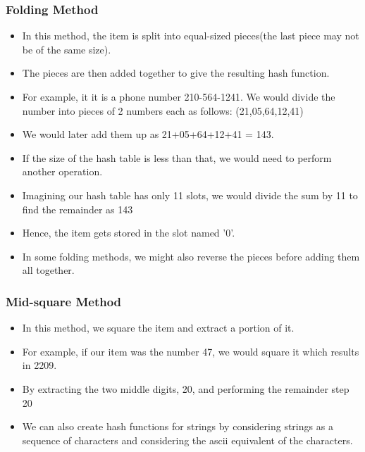 \documentclass{beamer}
\begin{document}
\begin{frame}
\frametitle{Folding Method}
\begin{itemize}
\item In this method, the item is split into equal-sized pieces(the last piece may not be of the same size).
\item The pieces are then added together to give the resulting hash function.
\item For example, it it is a phone number 210-564-1241. We would divide the number into pieces of 2 numbers each as follows:
(21,05,64,12,41)
\item We would later add them up as 21+05+64+12+41 = 143.
\item If the size of the hash table is less than that, we would need to perform another operation.
\item Imagining our hash table has only 11 slots, we would divide the sum by 11 to find the remainder as 143%
\item Hence, the item gets stored in the slot named '0'.
\item In some folding methods, we might also reverse the pieces before adding them all together.
\end{itemize}
\end{frame}

\begin{frame}
\frametitle{Mid-square Method}
\begin{itemize}
\item In this method, we square the item and extract a portion of it.
\item For example, if our  item was the number 47, we would square it which results in 2209.
\item By extracting the two middle digits, 20, and performing the remainder step 20%
\item We can also create hash functions for strings by considering strings as a sequence of characters and considering the ascii equivalent of the characters.
\end{itemize}
\end{frame}
\end{document}
